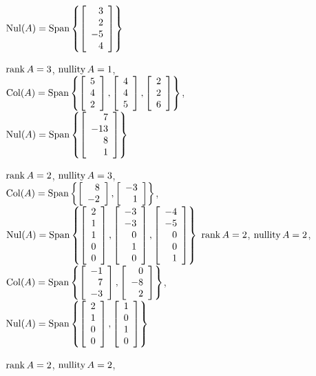 \begin{enumerate}[!HW!, start=1]
\begin{multicols}{2}
$\nul(A)=\Span\left\{\vr{3\\2\\-5\\4}\right\}$ \columnbreak
\item $\rank A = 3$, $\nullity A = 1$,\\ %
$\col(A) = \Span\left\{\vr{5\\4\\2}, \vr{4\\4\\5}, \vr{2\\2\\6}\right\}$,\\
$\nul(A)=\Span\left\{\vr{7\\-13\\8\\1}\right\}$ 
\end{multicols}
\begin{multicols}{2}
\itemspade $\rank A = 2$, $\nullity A = 3$,\\$\col(A)=\Span\left\{\vr{8\\-2}, \vr{-3\\1}\right\}$,\\  $\nul(A) = \Span\left\{\vr{2\\1\\1\\0\\0}, \vr{-3\\-3\\0\\1\\0}, \vr{-4\\-5\\0\\0\\1}\right\}$
\columnbreak
\itemspade $\rank A = 2$, $\nullity A = 2$,\\
$\col(A) =\Span\left\{\vr{-1\\7\\-3}, \vr{0\\-8\\2}\right\}$,\\  $\nul(A) = \Span\left\{\vr{2\\1\\0\\0}, \vr{1\\0\\1\\0}\right\}$
\end{multicols}
\begin{multicols}{2}
\item $\rank A = 2$, $\nullity A = 2$,\\

\end{multicols}
\end{enumerate}
